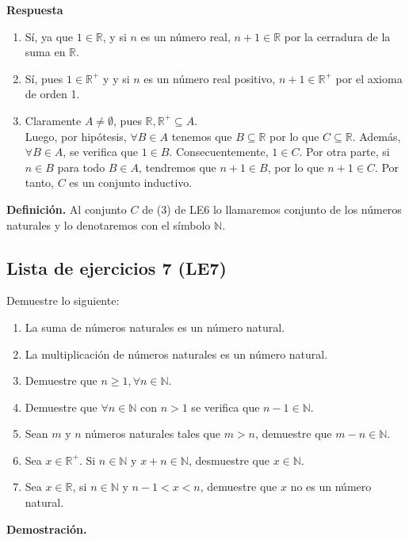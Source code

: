 \documentclass[11pt]{article}
\newcommand{\N}{\mathbb{N}}
\newcommand{\R}{\mathbb{R}}
\begin{document}
\textbf{Respuesta}

\begin{enumerate}[label=\arabic*)]
    \item Sí, ya que $1 \in \R$, y si $n$ es un número real, $n+1 \in \R$ por la cerradura de la suma en $\R$.
    \item Sí, pues $1\in \R^+$ y y si $n$ es un número real positivo, $n+1 \in \R^+$ por el axioma de orden 1.
    \item Claramente $A \neq \emptyset$, pues $\R, \R^+ \subseteq A$. \\[5pt]Luego, por hipótesis, $\forall B \in A$ tenemos que $B\subseteq \R $ por lo que $C\subseteq \R$. Además, $\forall B\in A$, se verifica que $1\in B$. Consecuentemente, $1\in C$. Por otra parte, si $n\in B$ para todo $B\in A$, tendremos que $n+1\in B$, por lo que $n+1 \in C$. Por tanto, $C$ es un conjunto inductivo.
\end{enumerate}

\textbf{Definición.} Al conjunto $C$ de (3) de LE6 lo llamaremos conjunto de los números naturales y lo denotaremos con el símbolo $\N$.

\subsection*{Lista de ejercicios 7 (LE7)}

Demuestre lo siguiente:

\begin{enumerate}[label=\alph*)]
    \item La suma de números naturales es un número natural.
    \item La multiplicación de números naturales es un número natural.
    \item Demuestre que $n\geq 1, \forall n\in \N$.
    \item Demuestre que $\forall n\in \N$ con $n>1$ se verifica que $n-1\in \N$.
    \item Sean $m$ y $n$ números naturales tales que $m>n$, demuestre que $m-n\in\N$.
    \item Sea $x\in \R^+$. Si $n\in \N$ y $x+n\in \N$, desmuestre que $x\in \N$.
    \item Sea $x\in \R$, si $n\in \N$ y $n-1<x<n$, demuestre que $x$ no es un número natural.
\end{enumerate}

\textbf{Demostración.}
\end{document}
